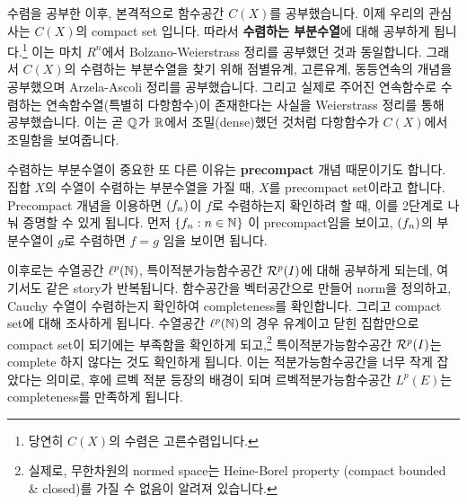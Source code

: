 수렴을 공부한 이후, 본격적으로 함수공간 \(C(X)\)를 공부했습니다. 이제 우리의 관심사는 \(C(X)\)의 compact set 입니다. 따라서 \textbf{수렴하는 부분수열}에 대해 공부하게 됩니다.\footnote{당연히 \(C(X)\)의 수렴은 고른수렴입니다.} 이는 마치 \(R^n\)에서 Bolzano-Weierstrass 정리를 공부했던 것과 동일합니다. 그래서 \(C(X)\)의 수렴하는 부분수열을 찾기 위해 점별유계, 고른유계, 동등연속의 개념을 공부했으며 Arzela-Ascoli 정리를 공부했습니다. 그리고 실제로 주어진 연속함수로 수렴하는 연속함수열(특별히 다항함수)이 존재한다는 사실을 Weierstrass 정리를 통해 공부했습니다. 이는 곧 \(\mathbb{Q}\)가 \(\mathbb{R}\)에서 조밀(dense)했던 것처럼 다항함수가 \(C(X)\)에서 조밀함을 보여줍니다.

수렴하는 부분수열이 중요한 또 다른 이유는 \textbf{precompact} 개념 때문이기도 합니다. 집합 \(X\)의 수열이 수렴하는 부분수열을 가질 때, \(X\)를 precompact set이라고 합니다. Precompact 개념을 이용하면 \(\left( f_n \right)\)이 \(f\)로 수렴하는지 확인하려 할 때, 이를 2단계로 나눠 증명할 수 있게 됩니다. 먼저 \(\{f_n : n \in \mathbb{N}\}\) 이 precompact임을 보이고, \(\left( f_n \right)\)의 부분수열이 \(g\)로 수렴하면 \(f = g\) 임을 보이면 됩니다.

이후로는 수열공간 \(\ell^p(\mathbb{N})\), 특이적분가능함수공간 \(\mathcal{R}^p(I)\)에 대해 공부하게 되는데, 여기서도 같은 story가 반복됩니다. 함수공간을 벡터공간으로 만들어 norm을 정의하고, Cauchy 수열이 수렴하는지 확인하여 completeness를 확인합니다. 그리고 compact set에 대해 조사하게 됩니다. 수열공간 \(\ell^p(\mathbb{N})\)의 경우 유계이고 닫힌 집합만으로 compact set이 되기에는 부족함을 확인하게 되고,\footnote{실제로, 무한차원의 normed space는 Heine-Borel property (compact \miff bounded \& closed)를 가질 수 없음이 알려져 있습니다.} 특이적분가능함수공간 \(\mathcal{R}^p(I)\)는 complete 하지 않다는 것도 확인하게 됩니다. 이는 적분가능함수공간을 너무 작게 잡았다는 의미로, 후에 르벡 적분 등장의 배경이 되며 르벡적분가능함수공간 \(L^p(E)\)는 completeness를 만족하게 됩니다.

\pagebreak
